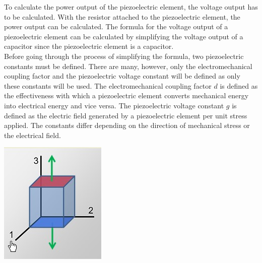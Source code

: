 To calculate the power output of the piezoelectric element, the voltage output has to be calculated. With the resistor attached to the piezoelectric element, the power output can be calculated. The formula for the voltage output of a piezoelectric element can be calculated by simplifying the voltage output of a capacitor since the piezoelectric element is a capacitor.\\
Before going through the process of simplifying the formula, two piezoelectric constants must be defined. There are many, however, only the electromechanical coupling factor and the piezoelectric voltage constant will be defined as only these constants will be used. The electromechanical coupling factor $d$ is defined as the effectiveness with which a piezoelectric element converts mechanical energy into electrical energy and vice versa. The piezoelectric voltage constant $g$ is defined as the electric field generated by a piezoelectric element per unit stress applied. The constants differ depending on the direction of mechanical stress or the electrical field.\\
\begin{minipage}{0.33\textwidth}
    \vspace{0.5cm}
    \includegraphics[width=\textwidth]{./Figure_5.jpg}
    \label{fig:Expansion Mode of the Piezoelectric Element}
\end{minipage}
